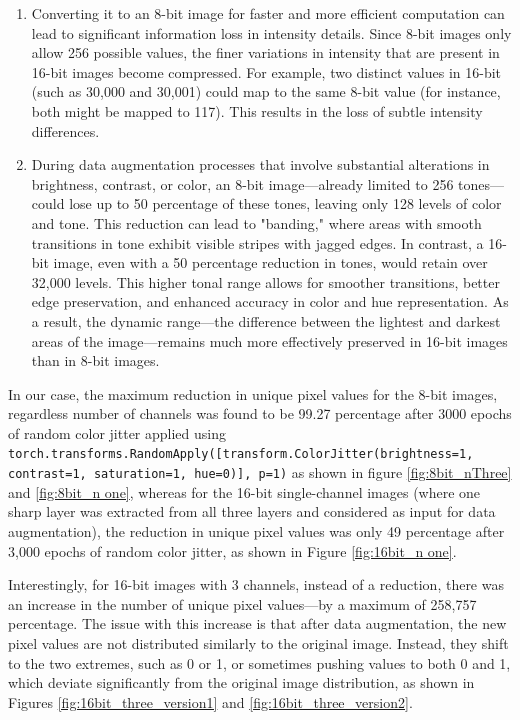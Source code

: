 \documentclass[12pt,twoside,a4paper,parskip]{scrbook} %
\begin{document}
\begin{enumerate}
  \item Converting it to an 8-bit image for faster and more efficient computation can lead to significant information loss in intensity details. Since 8-bit images only allow 256 possible values, the finer variations in intensity that are present in 16-bit images become compressed. For example, two distinct values in 16-bit (such as 30,000 and 30,001) could map to the same 8-bit value (for instance, both might be mapped to 117). This results in the loss of subtle intensity differences. 

  \item During data augmentation processes that involve substantial alterations in brightness, contrast, or color, an 8-bit image—already limited to 256 tones—could lose up to 50 percentage of these tones, leaving only 128 levels of color and tone. This reduction can lead to "banding," where areas with smooth transitions in tone exhibit visible stripes with jagged edges. In contrast, a 16-bit image, even with a 50 percentage reduction in tones, would retain over 32,000 levels. This higher tonal range allows for smoother transitions, better edge preservation, and enhanced accuracy in color and hue representation. As a result, the dynamic range—the difference between the lightest and darkest areas of the image—remains much more effectively preserved in 16-bit images than in 8-bit images.
\end{enumerate}
In our case, the maximum reduction in unique pixel values for the 8-bit images, regardless number of channels was found to be 99.27 percentage after 3000 epochs of random
color jitter applied  using \texttt{torch.transforms.RandomApply([transform.ColorJitter(brightness=1, contrast=1, saturation=1, hue=0)], p=1)} as shown in figure \ref{fig:8bit_nThree} and \ref{fig:8bit_n one}, whereas for the 16-bit single-channel images (where one sharp layer was extracted from all three layers and considered as input for data augmentation), the reduction in unique pixel values was only 49 percentage after 3,000 epochs of random color jitter, as shown in Figure \ref{fig:16bit_n one}.

Interestingly, for 16-bit images with 3 channels, instead of a reduction, there was an increase in the number of unique pixel values—by a maximum of 258,757 percentage. The issue with this increase is that after data augmentation, the new pixel values are not distributed similarly to the original image. Instead, they shift to the two extremes, such as 0 or 1, or sometimes pushing values to both 0 and 1, which deviate significantly from the original image distribution, as shown in Figures \ref{fig:16bit_three_version1} and \ref{fig:16bit_three_version2}.
\end{document}
